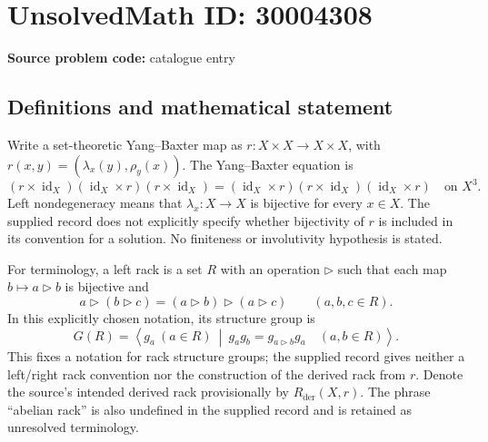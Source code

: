 \documentclass[11pt]{article}
\begin{document}
\section*{UnsolvedMath ID: 30004308}
\textbf{Source problem code:} catalogue entry
\subsection{Definitions and mathematical statement}
Write a set-theoretic Yang--Baxter map as \(r\colon X\times X\to X\times X\), with \(r(x,y)=(\lambda_x(y),\rho_y(x))\). The Yang--Baxter equation is
\[
(r\times\operatorname{id}_X)(\operatorname{id}_X\times r)(r\times\operatorname{id}_X)
=
(\operatorname{id}_X\times r)(r\times\operatorname{id}_X)(\operatorname{id}_X\times r)
\quad\text{on }X^3.
\]
Left nondegeneracy means that \(\lambda_x\colon X\to X\) is bijective for every \(x\in X\). The supplied record does not explicitly specify whether bijectivity of \(r\) is included in its convention for a solution. No finiteness or involutivity hypothesis is stated.

For terminology, a left rack is a set \(R\) with an operation \(\triangleright\) such that each map \(b\mapsto a\triangleright b\) is bijective and
\[
a\triangleright(b\triangleright c)
=(a\triangleright b)\triangleright(a\triangleright c)
\qquad(a,b,c\in R).
\]
In this explicitly chosen notation, its structure group is
\[
G(R)=\left\langle g_a\ (a\in R)\ \middle|\
g_a g_b=g_{a\triangleright b}g_a\quad(a,b\in R)\right\rangle.
\]
This fixes a notation for rack structure groups; the supplied record gives neither a left/right rack convention nor the construction of the derived rack from \(r\). Denote the source's intended derived rack provisionally by \(R_{\mathrm{der}}(X,r)\). The phrase ``abelian rack'' is also undefined in the supplied record and is retained as unresolved terminology.
\end{document}

